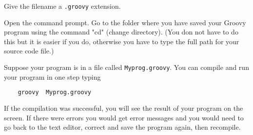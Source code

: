 Give the filename a \texttt{.groovy} extension.

Open the command prompt. 
Go to the folder where you have saved your Groovy
program using the command "cd" (change directory). (You don not have to
do this but it is easier if you do, otherwise you have to type the full
path for your source code file.)

Suppose your program is in a file called 
\texttt{Myprog.groovy}. You can compile and run your program in one step typing 

\begin{Verbatim}
    groovy  Myprog.groovy
\end{Verbatim}

If the compilation was successful, you will see the result of your
program on the screen.
%
If there were errors you would get error messages and you would need
to go back to the text editor, correct and save the program again,
then recompile.



